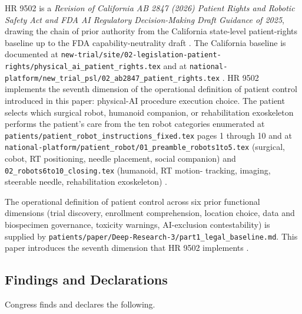 
HR 9502 is a \textit{Revision of California AB 2847 (2026) Patient
Rights and Robotic Safety Act and FDA AI Regulatory Decision-Making
Draft Guidance of 2025}, drawing the chain of prior authority from
the California state-level patient-rights baseline up to the FDA
capability-neutrality draft \cite{fda_ai_regulatory_decision_draft_2025}.
The California baseline is documented at
\texttt{new-trial/site/02-legislation-patient-rights/physical\_ai\_patient\_rights.tex}
and at
\texttt{national-platform/new\_trial\_psl/02\_ab2847\_patient\_rights.tex}
\cite{kawchak_2026_19176370, kawchak_2026_19244918}. HR 9502 implements
the seventh dimension of the operational definition of patient
control introduced in this paper: physical-AI procedure execution
choice. The patient selects which surgical robot, humanoid companion,
or rehabilitation exoskeleton performs the patient's care from the
ten robot categories enumerated at
\texttt{patients/patient\_robot\_instructions\_fixed.tex} pages 1
through 10 and at
\texttt{national-platform/patient\_robot/01\_preamble\_robots1to5.tex}
(surgical, cobot, RT positioning, needle placement, social companion)
and \texttt{02\_robots6to10\_closing.tex} (humanoid, RT motion-
tracking, imaging, steerable needle, rehabilitation exoskeleton)
\cite{kawchak_2026_18810541, kawchak_2026_18778219,
target2025robotic_bronchoscopy}.

The operational definition of patient control across six prior
functional dimensions (trial discovery, enrollment comprehension,
location choice, data and biospecimen governance, toxicity warnings,
AI-exclusion contestability) is supplied by
\texttt{patients/paper/Deep-Research-3/part1\_legal\_baseline.md}.
This paper introduces the seventh dimension that HR 9502 implements
\cite{hhs_45cfr46_protection_human_subjects,
fda_informed_consent_guidance_2023, fda_dct_guidance_2024}.

\subsection{Findings and Declarations}

Congress finds and declares the following.


